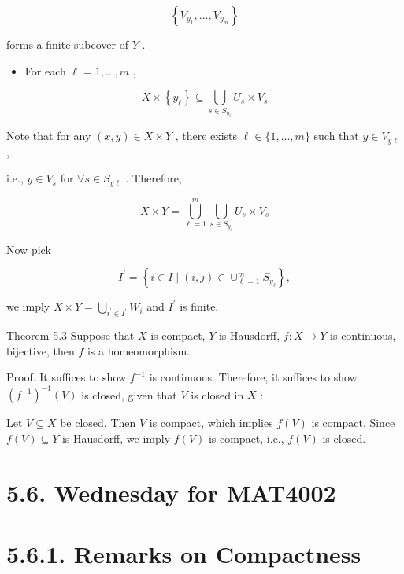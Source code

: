 \[
\left\{  {{V}_{{y}_{1}},\ldots ,{V}_{{y}_{m}}}\right\}
\]

forms a finite subcover of \(Y\) .

\begin{itemize}
\item For each \(\ell  = 1,\ldots ,m\) ,
\end{itemize}

\[
X \times  \left\{  {y}_{\ell }\right\}   \subseteq  \mathop{\bigcup }\limits_{{s \in  {S}_{{y}_{\ell }}}}{U}_{s} \times  {V}_{s}
\]

Note that for any \(\left( {x,y}\right)  \in  X \times  Y\) , there exists \(\ell  \in  \{ 1,\ldots ,m\}\) such that \(y \in  {V}_{y\ell }\) ,

i.e., \(y \in  {V}_{s}\) for \(\forall s \in  {S}_{y\ell }\) . Therefore,

\[
X \times  Y = \mathop{\bigcup }\limits_{{\ell  = 1}}^{m}\mathop{\bigcup }\limits_{{s \in  {S}_{{y}_{\ell }}}}{U}_{s} \times  {V}_{s}
\]

Now pick

\[
{I}^{\prime } = \left\{  {i \in  I \mid  \left( {i,j}\right)  \in  { \cup  }_{\ell  = 1}^{m}{S}_{{y}_{\ell }}}\right\}  ,
\]

we imply \(X \times  Y = \mathop{\bigcup }\limits_{{{i}^{\prime } \in  {I}^{\prime }}}{W}_{i}\) and \({I}^{\prime }\) is finite.

Theorem 5.3 Suppose that \(X\) is compact, \(Y\) is Hausdorff, \(f : X \rightarrow  Y\) is continuous, bijective, then \(f\) is a homeomorphism.

Proof. It suffices to show \({f}^{-1}\) is continuous. Therefore, it suffices to show \({\left( {f}^{-1}\right) }^{-1}\left( V\right)\) is closed, given that \(V\) is closed in \(X\) :

Let \(V \subseteq  X\) be closed. Then \(V\) is compact, which implies \(f\left( V\right)\) is compact. Since \(f\left( V\right)  \subseteq  Y\) is Hausdorff, we imply \(f\left( V\right)\) is compact, i.e., \(f\left( V\right)\) is closed.

\section*{5.6. Wednesday for MAT4002}

\section*{5.6.1. Remarks on Compactness}


